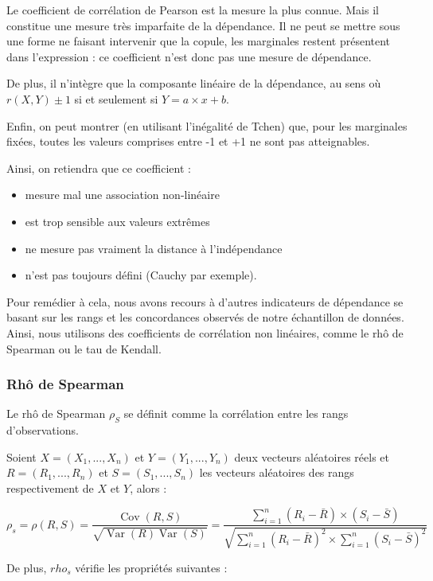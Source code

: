Le coefficient de corrélation de Pearson est la mesure la plus connue. Mais il constitue une mesure très imparfaite de la dépendance. Il ne
peut se mettre sous une forme ne faisant intervenir que la copule, les marginales restent présentent dans l’expression : ce coefficient n’est donc
pas une mesure de dépendance.

De plus, il n’intègre que la composante linéaire de la dépendance, au sens où $r(X,Y) \pm 1$ si et seulement si $Y= a \times x + b$.

Enfin, on peut montrer (en utilisant l'inégalité de Tchen) que, pour les marginales fixées, toutes les valeurs
comprises entre -1 et +1 ne sont pas atteignables.

Ainsi, on retiendra que ce coefficient :

\begin{itemize}
\item mesure mal une association non-linéaire
\item est trop sensible aux valeurs extrêmes 
\item ne mesure pas vraiment la distance à l'indépendance
\item n'est pas toujours défini (Cauchy par exemple).
\end{itemize}

Pour remédier à cela, nous avons recours à d’autres indicateurs de dépendance se basant sur les rangs et les concordances observés de notre échantillon de données. 
Ainsi, nous utilisons des coefficients de corrélation non linéaires, comme le rhô de Spearman ou le tau de Kendall.

\subsubsection{Rhô de Spearman}

Le rhô de Spearman $\rho_S$ se définit comme la corrélation entre les rangs d'observations.

Soient $X=(X_1,...,X_n)$ et $Y=(Y_1,...,Y_n)$ deux vecteurs aléatoires réels et $R = (R_1,...,R_n)$ et $S = (S_1,...,S_n)$ les vecteurs aléatoires des rangs respectivement
de $X$ et $Y$, alors :

$$
\rho_s = \rho(R,S) = \frac{\operatorname{Cov}(R,S)}{\sqrt{ \operatorname{Var}(R) \operatorname{Var}(S)}} = \frac{ \sum_{i=1}^n (R_i - \bar{R}) \times (S_i - \bar{S})  }{ \sqrt{   \sum_{i=1}^n (R_i - \bar{R})^2 \times  \sum_{i=1}^n (S_i - \bar{S})^2    }    }
$$

De plus, $rho_s$ vérifie les propriétés suivantes :

